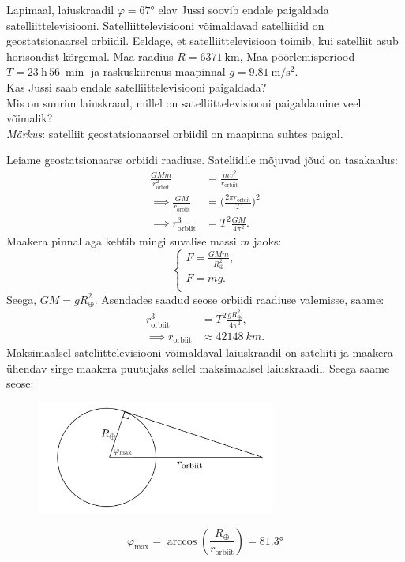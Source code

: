 
Lapimaal, laiuskraadil $\varphi =\ang{67}$ elav Jussi soovib endale paigaldada satelliittelevisiooni. Satelliittelevisiooni võimaldavad satelliidid on geostatsionaarsel orbiidil. Eeldage, et satelliittelevisioon toimib, kui satelliit asub horisondist kõrgemal. Maa raadius $R=\qty{6371}{\km}$, Maa pöörlemisperiood $T=\qty{23}{\hour}\, \qty{56}{\min}$ ja raskuskiirenus maapinnal $g= \qty{9.81}{\m\per\s\squared}$.\\
\osa Kas Jussi saab endale satelliittelevisiooni paigaldada?\\
\osa Mis on suurim laiuskraad, millel on satelliittelevisiooni paigaldamine veel võimalik?
\\ \emph{Märkus}: satelliit geostatsionaarsel orbiidil on maapinna suhtes paigal.


\hint

\solu
Leiame geostatsionaarse orbiidi raadiuse. Sateliidile mõjuvad jõud on tasakaalus:
\begin{align*}
\frac{GMm}{r_\text{orbiit}^2}&=\frac{mv^2}{r_\text{orbiit}}\\
\implies \frac{GM}{r_\text{orbiit}}&= \bigg( \frac{2\pi r_\text{orbiit}}{T} \bigg)^2\\
\implies r_\text{orbiit}^3 &= T^2 \frac{GM}{4 \pi^2}.
\end{align*}
Maakera pinnal aga kehtib mingi suvalise massi $m$ jaoks:
\begin{equation*}
  \begin{cases}
    F = \frac{GMm}{R_\oplus^2}, \\
    F = mg. \\
  \end{cases}
\end{equation*}
Seega, $GM = g R_\oplus^2$. Asendades saadud seose orbiidi raadiuse valemisse, saame:
\begin{align*}
r_\mathrm{orbiit}^3 &= T^2 \frac{g R_\oplus^2}{4 \pi^2},\\
\implies r_\mathrm{orbiit} &\approx \SI{42148}{km}.
\end{align*}
Maksimaalsel sateliittelevisiooni võimaldaval laiuskraadil on sateliiti ja maakera ühendav sirge maakera puutujaks sellel maksimaalsel laiuskraadil. Seega saame seose:
\begin{figure}[h]
  \centering
  \includegraphics[width = 0.7\textwidth]{2022-v2g-05-sol.png}
\end{figure}
\begin{equation*}
\varphi_\mathrm{max} = \arccos{\left( \frac{R_\oplus}{r_\text{orbiit}}\right)} = \ang{81.3}
\end{equation*}
\probend